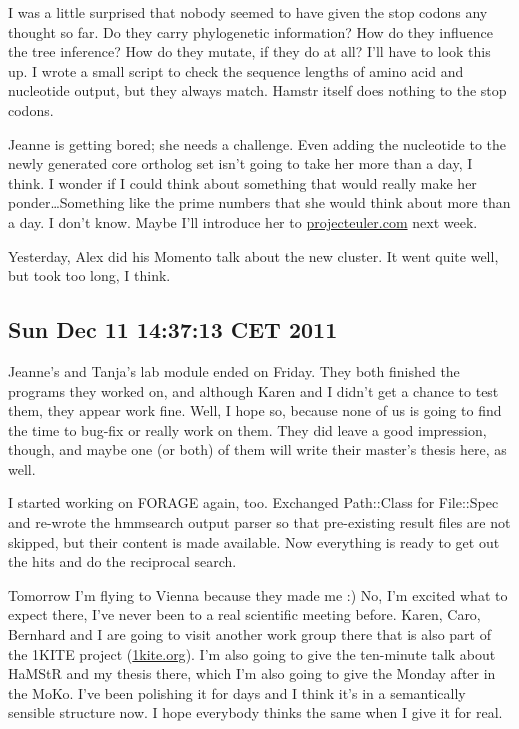 I was a little surprised that nobody seemed to have given the stop codons any
thought so far. Do they carry phylogenetic information? How do they influence the
tree inference? How do they mutate, if they do at all? I'll have to look this
up. I wrote a small script to check the sequence lengths of amino acid and
nucleotide output, but they always match. Hamstr itself does nothing to the stop
codons.

Jeanne is getting bored; she needs a challenge. Even adding the nucleotide to
the newly generated core ortholog set isn't going to take her more than a day, I
think. I wonder if I could think about something that would really make her
ponder\ldots Something like the prime numbers that she would think about more
than a day. I don't know. Maybe I'll introduce her to \url{projecteuler.com}
next week.

Yesterday, Alex did his Momento talk about the new cluster. It went quite well,
but took too long, I think. 

\subsection*{Sun Dec 11 14:37:13 CET 2011}

Jeanne's and Tanja's lab module ended on Friday. They both finished the
programs they worked on, and although Karen and I didn't get a chance to test
them, they appear work fine. Well, I hope so, because none of us is going to
find the time to bug-fix or really work on them. They did leave a good
impression, though, and maybe one (or both) of them will write their master's
thesis here, as well. 

I started working on FORAGE again, too. Exchanged Path::Class for File::Spec and
re-wrote the hmmsearch output parser so that pre-existing result files are not
skipped, but their content is made available. Now everything is ready to get out
the hits and do the reciprocal search.

Tomorrow I'm flying to Vienna because they made me :) No, I'm excited what to
expect there, I've never been to a real scientific meeting before. Karen, Caro,
Bernhard and I are going to visit another work group there that is also part of
the 1KITE project (\url{1kite.org}). I'm also going to give the ten-minute talk
about HaMStR and my thesis there, which I'm also going to give the Monday after
in the MoKo. I've been polishing it for days and I think it's in a semantically
sensible structure now. I hope everybody thinks the same when I give it for real.

